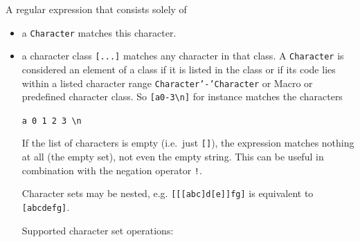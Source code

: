 A regular expression that consists solely of

\begin{itemize}
\item
  a \texttt{Character} matches this character.
\item
  a character class \texttt{{[}...{]}} matches any character in that
  class. A \texttt{Character} is considered an element of a class if it
  is listed in the class or if its code lies within a listed character
  range \texttt{Character’-’Character} or Macro or predefined character
  class. So \texttt{{[}a0-3\textbackslash{}n{]}} for instance matches
  the characters

  \texttt{a\ 0\ 1\ 2\ 3\ \textbackslash{}n}

  If the list of characters is empty (i.e.~just \texttt{{[}{]}}), the
  expression matches nothing at all (the empty set), not even the empty
  string. This can be useful in combination with the negation operator
  \texttt{!}.

  Character sets may be nested, e.g.
  \texttt{{[}{[}{[}abc{]}d{[}e{]}{]}fg{]}} is equivalent to
  \texttt{{[}abcdefg{]}}.

  Supported character set operations:


\end{itemize}
